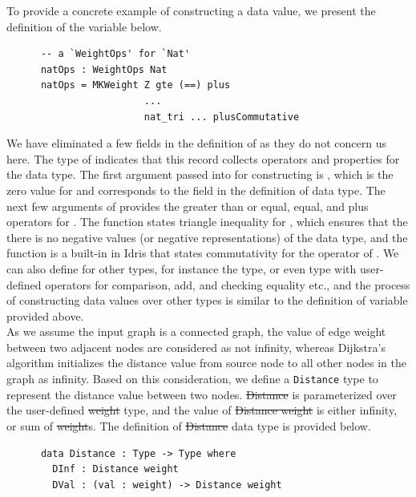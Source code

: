 To provide a concrete example of constructing a  data value, we present the definition of the  variable below. 
\begin{lstlisting}
      -- a `WeightOps' for `Nat'
      natOps : WeightOps Nat
      natOps = MKWeight Z gte (==) plus
                        ...
                        nat_tri ... plusCommutative
\end{lstlisting}

We have eliminated a few fields in the definition of  as they do not concern us here. The type of  indicates that this record collects operators and properties for the  data type. The first argument passed into  for constructing  is , which is the zero value for  and corresponds to the  field in the definition of  data type. The next few arguments of  provides the greater than or equal, equal, and plus operators for . The  function states triangle inequality for , which ensures that the there is no negative values (or negative representations) of the  data type, and the  function is a built-in in Idris that states commutativity for the  operator of . We can also define  for other  types, for instance the  type, or even  type with user-defined operators for comparison, add, and checking equality etc., and the process of constructing  data values over other  types is similar to the definition of  variable provided above. 
\\

As we assume the input graph is a connected graph, the value of edge weight between two adjacent nodes are considered as not infinity, whereas Dijkstra's algorithm initializes the distance value from source node to all other nodes in the graph as infinity. Based on this consideration, we define a \texttt{Distance} type to represent the distance value between two nodes. \st{Distance} is parameterized over the user-defined \st{weight} type, and the value of \st{Distance weight} is either infinity, or sum of \st{weight}s. The definition of \st{Distance} data type is provided below. 
\begin{lstlisting}
      data Distance : Type -> Type where
        DInf : Distance weight
        DVal : (val : weight) -> Distance weight
\end{lstlisting}

